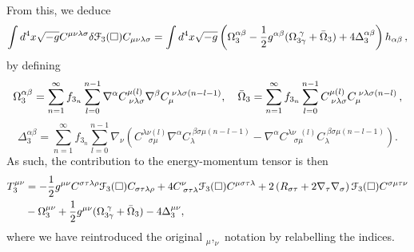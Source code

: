 From this, we deduce
\[
\int
d^{4}x\sqrt{-g} C^{\mu\nu\lambda\sigma}\delta{\cal
F}_{3}(\Box)C_{\mu\nu\lambda\sigma}=\int
d^{4}x\sqrt{-g}\left(\Omega_{3}^{\alpha\beta}-\frac{1}{2}g^{
\alpha\beta}(\Omega_{3\gamma}^{\;\gamma}+\bar{\Omega}_{3})+4\Delta_{3}^{
\alpha\beta}\right)h_{\alpha\beta}\,,
\]
by defining
\[
\Omega_{3}^{\alpha\beta}=\sum_{n=1}^{\infty}f_{3_{n}}\sum_{l=0}^{n-1}\nabla^{\alpha}C_{\;\nu\lambda\sigma}^{\mu(l)}\nabla^{\beta}C_{\mu}^{\;\nu\lambda\sigma(n-l-1)},\quad\bar{\Omega}_{3}=\sum_{n=1}^{\infty}f_{3_{n}}\sum_{l=0}^{n-1}C_{\;\nu\lambda\sigma}^{\mu(l)}C_{\mu}^{\;\nu\lambda\sigma(n-l)}\,,
\nonumber \]
\[
 \Delta_{3}^{\alpha\beta}=\sum_{n=1}^{\infty}f_{3_{n}}\sum_{l=0}^{n-1}\nabla_{\nu}\left(C_{\;\;\;\sigma\mu}^{\lambda\nu(l)}\nabla^{\alpha}C_{\lambda}^{\;\beta\sigma\mu(n-l-1)}-\nabla^{\alpha}C_{\;\;\;\sigma\mu}^{\lambda\nu\;\;(l)}C_{\lambda}^{\;\beta\sigma\mu(n-l-1)}\right).
 \]
As such, the contribution to the energy-momentum tensor is then
\begin{align}
T_{3}^{\mu\nu}	&=	-\frac{1}{2}g^{\mu\nu}C^{\sigma\tau\lambda\rho}{\cal F}_{3}(\Box)C_{\sigma\tau\lambda\rho}+4C_{\;\sigma\tau\lambda}^{\nu}{\cal F}_{3}(\Box)C^{\mu\sigma\tau\lambda}+2\left(R_{\sigma\tau}+2\nabla_{\tau}\nabla_{\sigma}\right){\cal F}_{3}(\Box)C^{\sigma\mu\tau\nu}
		\nonumber\\&-\Omega_{3}^{\mu\nu}+\frac{1}{2}g^{\mu\nu}(\Omega_{3\gamma}^{\;\gamma}+\bar{\Omega}_{3})-4\Delta_{3}^{\mu\nu},
   \end{align}
   where we have reintroduced the original $_\mu,_\nu$ notation by relabelling the indices.
